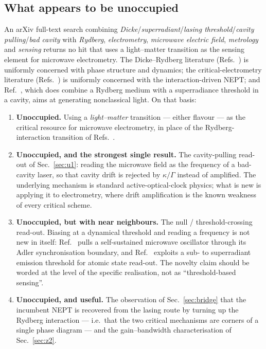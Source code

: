 \documentclass[11pt,a4paper]{article}
\begin{document}
\subsection{What appears to be unoccupied}

An arXiv full-text search combining \emph{Dicke}/\emph{superradiant}/\emph{lasing
threshold}/\emph{cavity pulling}/\emph{bad cavity} with \emph{Rydberg}, \emph{electrometry},
\emph{microwave electric field}, \emph{metrology} and \emph{sensing} returns no hit that uses a
light--matter transition as the sensing element for microwave electrometry. The Dicke--Rydberg
literature (Refs.~\cite{Zhang2013,Anisotropic2025,DickeIsing2025,RydDressed2026}) is uniformly
concerned with phase structure and dynamics; the critical-electrometry literature
(Refs.~\cite{Ding2022,Wang2025}) is uniformly concerned with the interaction-driven NEPT; and
Ref.~\cite{SteadySR2016}, which does combine a Rydberg medium with a superradiance threshold in
a cavity, aims at generating nonclassical light. On that basis:

\begin{enumerate}
  \item \textbf{Unoccupied.} Using a \emph{light--matter} transition --- either flavour --- as
        the critical resource for microwave electrometry, in place of the
        Rydberg-interaction transition of Refs.~\cite{Ding2022,Wang2025}.
  \item \textbf{Unoccupied, and the strongest single result.} The cavity-pulling read-out of
        Sec.~\ref{sec:u1}: reading the microwave field as the frequency of a bad-cavity laser,
        so that cavity drift is rejected by $\kappa/\Gamma$ instead of amplified. The
        underlying mechanism is standard active-optical-clock physics; what is new is applying
        it to electrometry, where drift amplification is the known weakness of every critical
        scheme.
  \item \textbf{Unoccupied, but with near neighbours.} The null / threshold-crossing read-out.
        Biasing at a dynamical threshold and reading a frequency is not new in itself:
        Ref.~\cite{InjPull2026} pulls a self-sustained microwave oscillator through its Adler
        synchronisation boundary, and Ref.~\cite{Ramsey2023} exploits a sub- to superradiant
        emission threshold for atomic state read-out. The novelty claim should be worded at the
        level of the specific realisation, not as ``threshold-based sensing''.
  \item \textbf{Unoccupied, and useful.} The observation of Sec.~\ref{sec:bridge} that the
        incumbent NEPT is recovered from the lasing route by turning up the Rydberg
        interaction --- i.e.\ that the two critical mechanisms are corners of a single phase
        diagram --- and the gain--bandwidth characterisation of Sec.~\ref{sec:z2}.
\end{enumerate}
\end{document}
